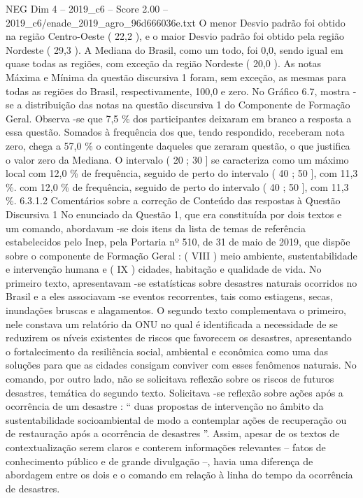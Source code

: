 \begin{textsample}{NEG Dim 4 – 2019\_c6 – Score 2.00 – 2019\_c6/enade\_2019\_agro\_96d666036e.txt}
O menor Desvio padrão foi obtido na região Centro-Oeste ( 22,2 ), e o maior Desvio padrão foi obtido pela região Nordeste ( 29,3 ).
A Mediana do Brasil, como um todo, foi 0,0, sendo igual em quase todas as regiões, com exceção da região Nordeste ( 20,0 ).
As notas Máxima e Mínima da questão discursiva 1 foram, sem exceção, as mesmas para todas as regiões do Brasil, respectivamente, 100,0 e zero.
No Gráfico 6.7, mostra -se a distribuição das notas na questão discursiva 1 do Componente de Formação Geral.
Observa -se que 7,5 \% dos participantes deixaram em branco a resposta a essa questão.
Somados à frequência dos que, tendo respondido, receberam nota zero, chega a 57,0 \% o contingente daqueles que zeraram questão, o que justifica o valor zero da Mediana.
O intervalo ( 20 ; 30 ] se caracteriza como um máximo local com 12,0 \% de frequência, seguido de perto do intervalo ( 40 ; 50 ], com 11,3 \%. com 12,0 \% de frequência, seguido de perto do intervalo ( 40 ; 50 ], com 11,3 \%. 6.3.1.2 Comentários sobre a correção de Conteúdo das respostas à Questão Discursiva 1 No enunciado da Questão 1, que era constituída por dois textos e um comando, abordavam -se dois itens da lista de temas de referência estabelecidos pelo Inep, pela Portaria nº 510, de 31 de maio de 2019, que dispõe sobre o componente de Formação Geral : ( VIII ) meio ambiente, sustentabilidade e intervenção humana e ( IX ) cidades, habitação e qualidade de vida.
No primeiro texto, apresentavam -se estatísticas sobre desastres naturais ocorridos no Brasil e a eles associavam -se eventos recorrentes, tais como estiagens, secas, inundações bruscas e alagamentos.
O segundo texto complementava o primeiro, nele constava um relatório da ONU no qual é identificada a necessidade de se reduzirem os níveis existentes de riscos que favorecem os desastres, apresentando o fortalecimento da resiliência social, ambiental e econômica como uma das soluções para que as cidades consigam conviver com esses fenômenos naturais.
No comando, por outro lado, não se solicitava reflexão sobre os riscos de futuros desastres, temática do segundo texto.
Solicitava -se reflexão sobre ações após a ocorrência de um desastre : “ duas propostas de intervenção no âmbito da sustentabilidade socioambiental de modo a contemplar ações de recuperação ou de restauração após a ocorrência de desastres ”.
Assim, apesar de os textos de contextualização serem claros e conterem informações relevantes – fatos de conhecimento público e de grande divulgação –, havia uma diferença de abordagem entre os dois e o comando em relação à linha do tempo da ocorrência de desastres.

\end{textsample}
